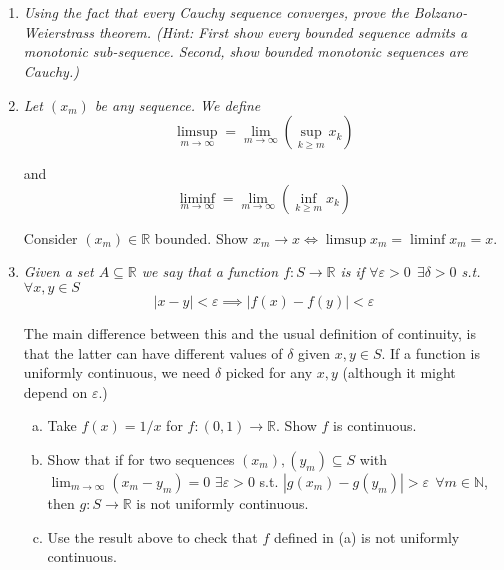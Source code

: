 \documentclass{article}
\begin{document}
\displayoptions

\section{}

\begin{enumerate}[1.]
  \item \textit{Using the fact that every Cauchy sequence converges, prove the Bolzano-Weierstrass theorem. (Hint: First show every bounded sequence admits a monotonic sub-sequence. Second, show bounded monotonic sequences are Cauchy.)}

  \item {\itshape
    Let $(x_m)$ be any sequence. We define
    \[
      \limsup_{m \to \infty} = \lim_{m \to \infty} \left(\sup_{k \ge m} x_k\right)
    \]

    and
    \[
      \liminf_{m \to \infty} = \lim_{m \to \infty} \left(\inf_{k \ge m} x_k\right)
    \]

    Consider $(x_m) \in \mathbb{R}$ bounded. Show $x_m \to x \iff \limsup x_m = \liminf x_m = x$.}

  \item {\itshape
    Given a set $A \subseteq \mathbb{R}$ we say that a function $f: S \to \mathbb{R}$ is  if $\forall \varepsilon > 0 ~~ \exists \delta > 0$ s.t. $\forall x, y \in S$
    \[
      |x - y| < \varepsilon \implies |f(x) - f(y)| < \varepsilon
    \]

    The main difference between this and the usual definition of continuity, is that the latter can have different values of $\delta$ given $x, y \in S$. If a function is uniformly continuous, we need $\delta$ picked for any $x, y$ (although it might depend on $\varepsilon$.)
    \begin{enumerate}[a)]
      \item Take $f(x) = 1 / x$ for $f: (0, 1) \to \mathbb{R}$. Show $f$ is continuous.

      \item Show that if for two sequences $(x_m), (y_m) \subseteq S$ with $\lim_{m \to \infty} (x_m - y_m) = 0$ $\exists \varepsilon > 0$ s.t. $|g(x_m) - g(y_m)| > \varepsilon ~~ \forall m \in \mathbb{N}$, then $g: S \to \mathbb{R}$ is not uniformly continuous.

      \item Use the result above to check that $f$ defined in (a) is not uniformly continuous.


\end{enumerate}}
\end{enumerate}
\end{document}
